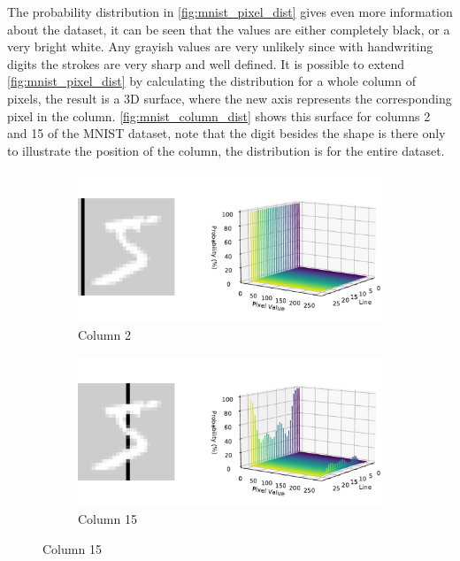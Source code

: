 The probability distribution in \autoref{fig:mnist_pixel_dist} gives even more information about the dataset, it can be seen that the values are either completely black, or a very bright white. Any grayish values are very unlikely since with handwriting digits the strokes are very sharp and well defined. It is possible to extend \autoref{fig:mnist_pixel_dist} by calculating the distribution for a whole column of pixels, the result is a 3D surface, where the new axis represents the corresponding pixel in the column. \autoref{fig:mnist_column_dist} shows this surface for columns 2 and 15 of the \gls{MNIST} dataset, note that the digit besides the shape is there only to illustrate the position of the column, the distribution is for the entire dataset.
\begin{figure}[hbt]
    \centering
    \caption{Probability distribution of values in columns of \gls{MNIST}}
    \begin{subfigure}{0.7\textwidth}
        \centering
        \includegraphics[width=\textwidth]{chapters/GANs/figures/mnist_highlight_dist_column_1.pdf}
        \caption{Column 2}
    \end{subfigure}
    
    \begin{subfigure}{0.7\textwidth}
        \centering
        \includegraphics[width=\textwidth]{chapters/GANs/figures/mnist_highlight_dist_column_14.pdf}
        \caption{Column 15}
    \end{subfigure}
    
    \label{fig:mnist_column_dist}
\end{figure}

